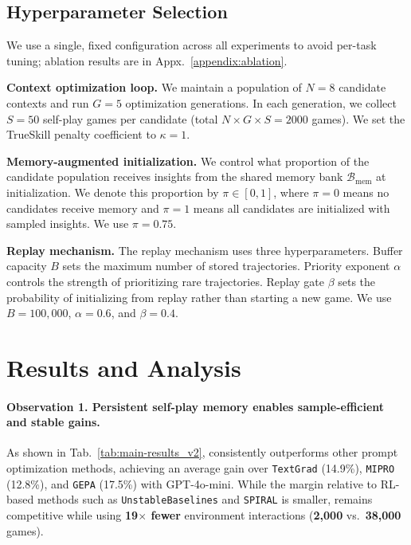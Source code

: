 \subsection{Hyperparameter Selection}
\label{sec:hyperparamselection}
We use a single, fixed configuration across all experiments to avoid per-task tuning; ablation results are in Appx.~\ref{appendix:ablation}. 

\textbf{Context optimization loop.}
We maintain a population of $N=8$ candidate contexts and run $G=5$ optimization generations.
In each generation, we collect $S=50$ self-play games per candidate (total $N \times G \times S = 2000$ games).
We set the TrueSkill penalty coefficient to $\kappa = 1$.

\textbf{Memory-augmented initialization.} We control what proportion of the candidate population receives insights from the shared memory bank $\mathcal{B}_{\text{mem}}$ at initialization. We denote this proportion by $\pi \in [0,1]$, where $\pi=0$ means no candidates receive memory and $\pi=1$ means all candidates are initialized with sampled insights. We use $\pi=0.75$.

\textbf{Replay mechanism.} The replay mechanism uses three hyperparameters. Buffer capacity $B$ sets the maximum number of stored trajectories. Priority exponent $\alpha$ controls the strength of prioritizing rare trajectories. Replay gate $\beta$ sets the probability of initializing from replay rather than starting a new game. We use $B=100{,}000$, $\alpha=0.6$, and $\beta=0.4$.
\section{Results and Analysis}



\paragraph{Observation 1. Persistent self-play memory enables sample-efficient and stable gains.}
As shown in Tab.~\ref{tab:main-results_v2}, \NAME{} consistently outperforms other prompt optimization methods, achieving an average gain over \texttt{TextGrad} (14.9\%), \texttt{MIPRO} (12.8\%), and \texttt{GEPA} (17.5\%) with GPT-4o-mini. While the margin relative to RL-based methods such as \texttt{UnstableBaselines} and \texttt{SPIRAL} is smaller, \NAME{} remains competitive while using \textbf{19$\times$ fewer} environment interactions (\textbf{2{,}000} vs.\ \textbf{38{,}000} games).

